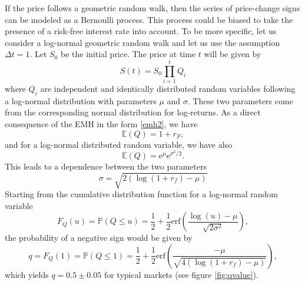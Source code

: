 \documentclass[a4paper]{jpconf}
\begin{document}
If the price follows a geometric random walk, then the series of price-change signs can be modeled as a Bernoulli process. This process could be biased to take the presence of a risk-free interest rate into account. To be more specific, let us consider a log-normal geometric random walk and let us use the assumption $\Delta t =1$. Let $S_0$ be the initial price. The price at time $t$ will be given by
\begin{equation}
S(t)=S_0 \prod_{i=1}^t Q_i
\end{equation}
where $Q_i$ are independent and identically distributed random variables following a log-normal distribution with parameters $\mu$ and $\sigma$. These two parameters come from the corresponding normal distribution for log-returns. As a direct consequence of the EMH in the form \eqref{emh2}, we have
\begin{equation}
\mathbb{E} (Q) = 1 + r_F,
\end{equation}
and for a log-normal distributed random variable, we have also
\begin{equation}
\mathbb{E}(Q) = \mathrm{e}^\mu \mathrm{e}^{\sigma^2/2}.
\end{equation}
This leads to a dependence between the two parameters
\begin{equation}
\sigma = \sqrt{2\left(\log(1+r_f)-\mu \right)}
\end{equation}
Starting from the cumulative distribution function for a log-normal random variable
\begin{equation}
F_Q(u)=\mathbb{P}(Q \leq u) = \frac{1}{2} + \frac{1}{2} \mathrm{erf}\left(
\frac{\log(u) -\mu}{\sqrt{2 \sigma^2}} \right),
\end{equation}
the probability of a negative sign would be given by
\begin{equation}
q=F_Q(1)=\mathbb{P}(Q \leq 1)=\frac{1}{2} + \frac{1}{2} \mathrm{erf}\left(
\frac{- \mu}{\sqrt{4(\log(1+r_f)-\mu)}} \right),
\end{equation}
which yields $q = 0.5 \pm 0.05$ for typical markets (see figure \ref{fig:qvalue}).
\end{document}
